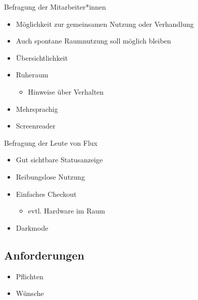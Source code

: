 \documentclass{sdqbeamer}
\begin{document}
\begin{frame}{Befragung der Mitarbeiter*innen}
    \begin{itemize}
        \item Möglichkeit zur \textcolor{kit-red100}{gemeinsamen Nutzung} oder Verhandlung 
        \item Auch \textcolor{kit-cyan100}{spontane} Raumnutzung soll möglich bleiben
        \item \textcolor{kit-green100}{Übersichtlichkeit}
        \item Ruheraum
        \begin{itemize}
            \item Hinweise über Verhalten
        \end{itemize}
        \item Mehrsprachig
        \item Screenreader
    \end{itemize}
\end{frame}

\begin{frame}{Befragung der Leute von Flux}
    \begin{itemize}
        \item Gut sichtbare \textcolor{kit-lightgreen100}{Statusanzeige}
        \item \textcolor{kit-orange100}{Reibungslose} Nutzung
        \item Einfaches \textcolor{kit-purple100}{Checkout}
        \begin{itemize}
            \item evtl. Hardware im Raum
        \end{itemize}
        \item Darkmode
    \end{itemize}
\end{frame}

\subsection{Anforderungen}
\begin{frame}{\insertsubsectionhead}
    \begin{itemize}
        \item Pflichten
        \item Wünsche
    \end{itemize}
\end{frame}
\end{document}
